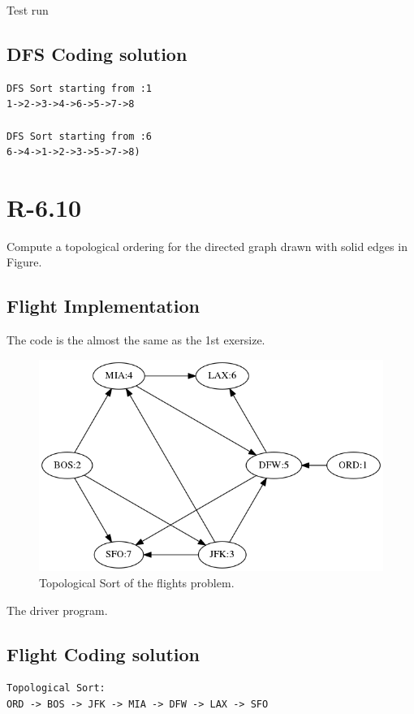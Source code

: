 \documentclass[a4paper,12pt]{article}
\begin{document}
Test run


\subsection*{DFS Coding solution}
\begin{verbatim}
DFS Sort starting from :1
1->2->3->4->6->5->7->8

DFS Sort starting from :6
6->4->1->2->3->5->7->8) 
\end{verbatim} 

\section*{R-6.10}
Compute a topological ordering for the directed graph drawn with solid
edges in Figure.

\subsection*{Flight Implementation}
The code is the almost the same as the 1st exersize.
 

\begin{figure} 
	\centering
	\includegraphics[width=12cm]{code/gflights-solution.png}
	\caption{Topological Sort of the flights problem.}	 
\end{figure}

The driver program.
 


\subsection*{Flight Coding solution}
\begin{verbatim}
Topological Sort:
ORD -> BOS -> JFK -> MIA -> DFW -> LAX -> SFO
\end{verbatim}
\end{document}
